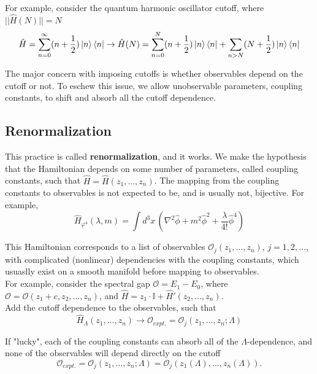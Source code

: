 \noindent For example, consider the quantum harmonic oscillator cutoff, where $||\hat{H}(N)|| = N$
\begin{equation}
\hat{H} = \sum_{n=0}^{\infty} (n+\frac{1}{2}) \ket{n}\bra{n} \to \hat{H}(N) = \sum_{n=0}^N (n+\frac{1}{2}) \ket{n}\bra{n} + \sum_{n>N} (N+\frac{1}{2}) \ket{n}\bra{n}
\end{equation}

\noindent The major concern with imposing cutoffs is whether observables depend on the cutoff or not. To eschew this issue, we allow unobservable parameters, coupling constants, to shift and absorb all the cutoff dependence. \\

\subsection*{Renormalization}

\noindent This practice is called \textbf{renormalization}, and it works. We make the hypothesis that the Hamiltonian depends on some number of parameters, called coupling constants, such that $\hat{H} = \hat{H}(z_1,\dots,z_n)$. The mapping from the coupling constants to observables is not expected to be, and is usually not, bijective. For example,
\begin{equation}
\hat{H}_{\varphi^4}(\lambda, m) = \int d^3 x \, \left( \nabla^2 \hat{\phi} + m^2 \hat{\phi}^2 + \frac{\lambda}{4!} \hat{\phi}^4 \right)
\end{equation}

\noindent This Hamiltonian corresponds to a list of observables $\mathcal{O}_j(z_1,\dots, z_n)$, $j=1,2,\dots$, with complicated (nonlinear) dependencies with the coupling constants, which usuaslly exist on a smooth manifold before mapping to observables. \\

\noindent For example, consider the spectral gap $\mathcal{O} = E_1-E_0$, where $\mathcal{O} = \mathcal{O}(z_1+c,z_2,\dots,z_n)$, and $\hat{H} = z_1\cdot \mathbb{I} + \hat{H}'(z_2,\dots,z_n)$. \\

\noindent Add the cutoff dependence to the observables, such that 
\begin{equation}
\hat{H}_\Lambda (z_1,\dots, z_n) \to \mathcal{O}_{expt.} = \mathcal{O}_j(z_1,\dots,z_n;\Lambda)
\end{equation}

\noindent If "lucky", each of the coupling constants can absorb all of the $\Lambda$-dependence, and none of the observables will depend directly on the cutoff
\begin{equation}
\mathcal{O}_{expt.} = \mathcal{O}_j(z_1,\dots,z_n;\Lambda) = \mathcal{O}_j(z_1(\Lambda) , \dots , z_n(\Lambda)) .
\end{equation}

